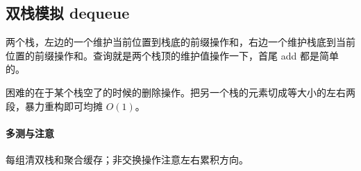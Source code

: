 \subsection{双栈模拟 dequeue}
两个栈，左边的一个维护当前位置到栈底的前缀操作和，右边一个维护栈底到当前位置的前缀操作和。查询就是两个栈顶的维护值操作一下，首尾 add 都是简单的。

困难的在于某个栈空了的时候的删除操作。把另一个栈的元素切成等大小的左右两段，暴力重构即可均摊 $O(1)$。

\paragraph{多测与注意} 每组清双栈和聚合缓存；非交换操作注意左右累积方向。
